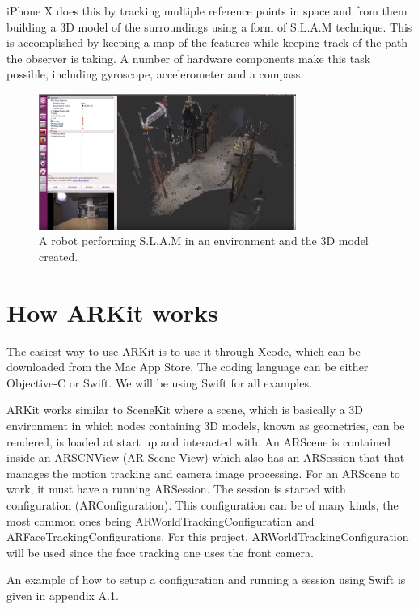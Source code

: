 iPhone X does this by tracking multiple reference points in space and from them building a 3D model of the surroundings using a form of S.L.A.M technique.
This is accomplished by keeping a map of the features while keeping track of the path the observer is taking. A number of 
hardware components make this task possible, including gyroscope, accelerometer and a compass. \cite{iphoneslam}

\begin{figure}[hbtp]
\begin{center}
\includegraphics[width = 0.75\textwidth]{./Images/slam-map.jpg} 
\caption{A robot performing S.L.A.M in an environment and the 3D model created.}
\label{fig:slam}
\end{center}
\end{figure}

\section{How ARKit works}
\label{subsecARKit}
The easiest way to use ARKit is to use it through Xcode, which can be downloaded from the Mac App Store.
The coding language can be either Objective-C or Swift. We will be using Swift for all
examples.

ARKit works similar to SceneKit where a scene, which is basically a 3D environment in which nodes containing 3D models, known as geometries, can be rendered, is loaded at start up and interacted with.
An ARScene is contained inside an ARSCNView (AR Scene View) which also has an ARSession
that that manages the motion tracking and camera image processing. For an ARScene to work, it must have a running ARSession.
The session is started with configuration (ARConfiguration). This configuration can be of many kinds, the most common ones being ARWorldTrackingConfiguration and ARFaceTrackingConfigurations. For this project, ARWorldTrackingConfiguration will be used since the face tracking one uses the front camera.

An example of how to setup a configuration and running a session using Swift is given in appendix A.1.

